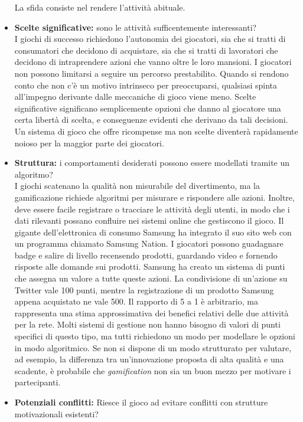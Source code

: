 \begin{itemize}
La sfida consiste nel rendere l'attività abituale.
  \item \textbf{Scelte significative:} sono le attività sufficentemente interessanti?\\
  I giochi di successo richiedono l'autonomia dei giocatori, sia che si tratti di consumatori che decidono di acquistare, sia che si tratti di lavoratori che decidono di intraprendere azioni che vanno oltre le loro mansioni. I giocatori non possono limitarsi a seguire un percorso prestabilito. Quando si rendono conto che non c'è un motivo intrinseco per preoccuparsi, qualsiasi spinta all'impegno derivante dalle meccaniche di gioco viene meno.
Scelte significative significano semplicemente opzioni che danno al giocatore una certa libertà di scelta, e conseguenze evidenti che derivano da tali decisioni. Un sistema di gioco che offre ricompense ma non scelte diventerà rapidamente noioso per la maggior parte dei giocatori.
  \item \textbf{Struttura:} i comportamenti desiderati possono essere modellati tramite un algoritmo?\\
  I giochi scatenano la qualità non misurabile del divertimento, ma la gamificazione richiede algoritmi per misurare e rispondere alle azioni. Inoltre, deve essere facile registrare o tracciare le attività degli utenti, in modo che i dati rilevanti possano confluire nei sistemi online che gestiscono il gioco.
Il gigante dell'elettronica di consumo Samsung ha integrato il suo sito web con un programma chiamato Samsung Nation. I giocatori possono guadagnare badge e salire di livello recensendo prodotti, guardando video e fornendo risposte alle domande sui prodotti. Samsung ha creato un sistema di punti che assegna un valore a tutte queste azioni. La condivisione di un'azione su Twitter vale 100 punti, mentre la registrazione di un prodotto Samsung appena acquistato ne vale 500.
Il rapporto di 5 a 1 è arbitrario, ma rappresenta una stima approssimativa dei benefici relativi delle due attività per la rete. Molti sistemi di gestione non hanno bisogno di valori di punti specifici di questo tipo, ma tutti richiedono un modo per modellare le opzioni in modo algoritmico. Se non si dispone di un modo strutturato per valutare, ad esempio, la differenza tra un'innovazione proposta di alta qualità e una scadente, è probabile che \textit{gamification} non sia un buon mezzo per motivare i partecipanti.
  \item \textbf{Potenziali conflitti:} Riesce il gioco ad evitare conflitti con strutture motivazionali esistenti?\\

\end{itemize}
